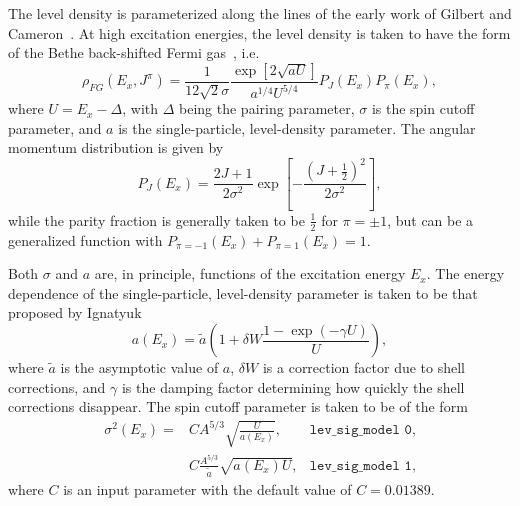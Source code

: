 \documentclass[
10pt,
showpacs,preprintnumbers,footinbib,
amsfonts,amsmath,amssymb,
aps,
prc,twocolumn,groupedaddress,superscriptaddress,
showkeys,
nofootinbib
]{revtex4-1}
\begin{document}
The level density is parameterized along the lines of the early work of Gilbert and Cameron~\cite{Gilbert:1965}. At high excitation energies, the level density is taken to have the form of the Bethe back-shifted Fermi gas~\cite{Bethe:1937}, i.e.
\begin{equation}
\rho_{FG}(E_x,J^\pi) = \frac{1}{12\sqrt{2}\sigma}\frac{\exp\left[2\sqrt{aU}\right ]}{a^{1/4}U^{5/4}} P_J(E_x) P_\pi(E_x),
\label{eq:rho_BFM}
\end{equation}
where $U=E_x - \Delta$, with $\Delta$ being the pairing parameter, $\sigma$ is the spin cutoff parameter, and $a$ is the single-particle, level-density parameter. The angular momentum distribution is given by
\begin{equation}
P_J(E_x) = \frac{2J+1}{2\sigma^2}\exp \left [ - \frac{(J+\frac{1}{2})^2}{2\sigma^2} \right ],
\end{equation}
while the parity fraction is generally taken to be $\frac{1}{2}$ for $\pi = \pm 1$, but can be a generalized function with $P_{\pi=-1}(E_x) + P_{\pi=1}(E_x) = 1$.  

Both $\sigma$ and $a$ are, in principle, functions of the excitation energy $E_x$. The energy dependence of the single-particle, level-density parameter is taken to be that proposed by Ignatyuk
\begin{equation}
a(E_x) = \tilde a \left ( 1+\delta W\frac{1-\exp(-\gamma U)}{U}\right),
\end{equation}
where $\tilde a$ is the asymptotic value of $a$, $\delta W$ is a correction factor due to shell corrections, and $\gamma$ is the damping factor determining how quickly the shell corrections disappear. The spin cutoff parameter is taken to be of the form
\begin{align}
\label{eq:sig_0}
\sigma^2(E_x) = & CA^{5/3}\sqrt{\frac{U}{a(E_x)}}, &{\texttt{lev\_sig\_model 0}}, \\
\label{eq:sig_1}
 & C\frac{A^{5/3}}{\tilde a}\sqrt{a(E_x)U}, &{\texttt{lev\_sig\_model 1}},
\end{align}
where $C$ is an input parameter with the default value of $C=0.01389$.
\end{document}
